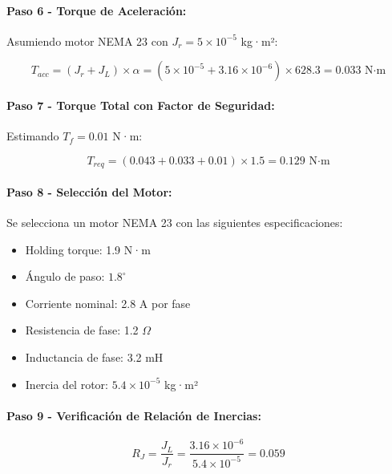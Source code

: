 \paragraph{Paso 6 - Torque de Aceleración:}

Asumiendo motor NEMA 23 con $J_r = 5 \times 10^{-5}$ kg·m²:

\begin{equation}
T_{acc} = (J_r + J_L) \times \alpha = (5 \times 10^{-5} + 3.16 \times 10^{-6}) \times 628.3 = 0.033 \text{ N·m}
\end{equation}

\paragraph{Paso 7 - Torque Total con Factor de Seguridad:}

Estimando $T_f = 0.01$ N·m:

\begin{equation}
T_{req} = (0.043 + 0.033 + 0.01) \times 1.5 = 0.129 \text{ N·m}
\end{equation}

\paragraph{Paso 8 - Selección del Motor:}

Se selecciona un motor NEMA 23 con las siguientes especificaciones:
\begin{itemize}
    \item Holding torque: 1.9 N·m
    \item Ángulo de paso: $1.8^\circ$
    \item Corriente nominal: 2.8 A por fase
    \item Resistencia de fase: 1.2 $\Omega$
    \item Inductancia de fase: 3.2 mH
    \item Inercia del rotor: $5.4 \times 10^{-5}$ kg·m²
\end{itemize}

\paragraph{Paso 9 - Verificación de Relación de Inercias:}

\begin{equation}
R_J = \frac{J_L}{J_r} = \frac{3.16 \times 10^{-6}}{5.4 \times 10^{-5}} = 0.059
\end{equation}

